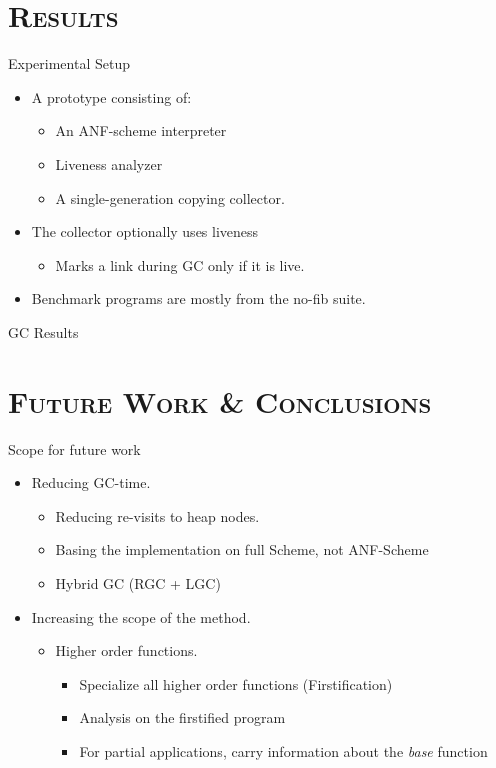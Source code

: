\documentclass[xcolor=x11names,compress,mathserif]{beamer}
\renewcommand{\(}{\begin{columns}}
\renewcommand{\)}{\end{columns}}
\newcommand{\<}[1]{\begin{column}{#1}}
\renewcommand{\>}{\end{column}}
\begin{document}
\section{\scshape Results}
\begin{frame}{Experimental Setup}
  \begin{itemize}\itemsep1em
  \item A prototype consisting of:
    \begin{itemize}
    \item An ANF-scheme interpreter
    \item Liveness analyzer
    \item A single-generation copying collector.
     \end{itemize}
  \item The collector optionally uses liveness
    \begin{itemize}
    \item Marks a link during GC only if it is live.
    \end{itemize}
  \item Benchmark programs are mostly from the no-fib suite. 
  \end{itemize}

\end{frame}

\begin{frame}[t]{GC Results}
  
\end{frame}
\section{\scshape Future Work  \& Conclusions} 
\begin{frame}{Scope for future work}
\normalsize
\begin{itemize}\itemsep2em
\item<1-> Reducing GC-time.
  \begin{itemize}
  \item Reducing re-visits to heap nodes.
  \item Basing the implementation on full Scheme, not ANF-Scheme
  \item Hybrid GC (RGC + LGC)
  \end{itemize}
\item<2-> Increasing the scope of the method.
  \begin{itemize}
   \item Higher order functions.
    \begin{itemize}
    \item Specialize all higher order functions (Firstification)
    \item Analysis on the firstified program 
    \item For partial applications, carry information about the {\em base} function
    \end{itemize}
  \end{itemize}
\end{itemize}
\end{frame}
\end{document}
